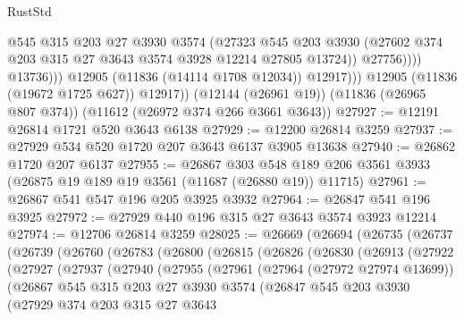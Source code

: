 \begin{lexlean}{RustStd}
\begin{coremodule}
                            @545
                            @315
                            @203
                            @27
                            @3930
                            @3574
                            (@27323
                              @545
                              @203
                              @3930
                              (@27602 @374 @203 @315 @27 @3643 @3574 @3928 @12214 @27805 @13724))
                            @27756))))
                    @13736)))
              @12905
              (@11836 (@14114 @1708 @12034))
              @12917)))
        @12905
        (@11836 (@19672 @1725 @627))
        @12917))
    (@12144 (@26961 @19))
    (@11836 (@26965 @807 @374))
    (@11612 (@26972 @374 @266 @3661 @3643))
@27927 := @12191 @26814 @1721 @520 @3643 @6138
@27929 := @12200 @26814 @3259
@27937 := @27929 @534 @520 @1720 @207 @3643 @6137 @3905 @13638
@27940 := @26862 @1720 @207 @6137
@27955 := @26867
    @303
    @548
    @189
    @206
    @3561
    @3933
    (@26875 @19 @189 @19 @3561 (@11687 (@26880 @19)) @11715)
@27961 := @26867 @541 @547 @196 @205 @3925 @3932
@27964 := @26847 @541 @196 @3925
@27972 := @27929 @440 @196 @315 @27 @3643 @3574 @3923 @12214
@27974 := @12706 @26814 @3259
@28025 := @26669
    (@26694
      (@26735
        (@26737
          (@26739
            (@26760
              (@26783
                (@26800
                  (@26815
                    (@26826
                      (@26830
                        (@26913
                          (@27922
                            (@27927
                              (@27937
                                (@27940
                                  (@27955
                                    (@27961
                                      (@27964 (@27972 @27974 @13699))
                                      (@26867
                                        @545
                                        @315
                                        @203
                                        @27
                                        @3930
                                        @3574
                                        (@26847
                                          @545
                                          @203
                                          @3930
                                          (@27929
                                            @374
                                            @203
                                            @315
                                            @27
                                            @3643

\end{coremodule}
\end{lexlean}
